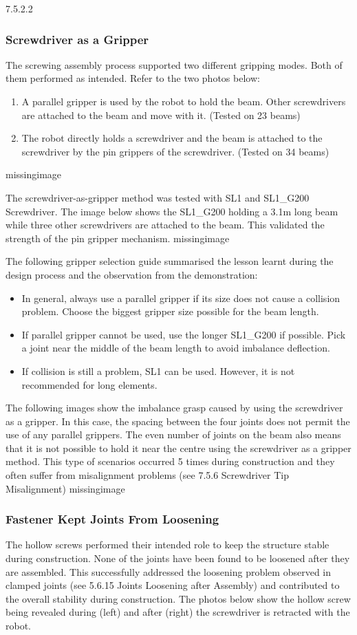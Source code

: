 7.5.2.2 \subsubsection{Screwdriver as a Gripper}
The screwing assembly process supported two different gripping modes. Both of them performed as intended. Refer to the two photos below:
\begin{enumerate}
    \item A parallel gripper is used by the robot to hold the beam. Other screwdrivers are attached to the beam and move with it. (Tested on 23 beams)
    \item The robot directly holds a screwdriver and the beam is attached to the screwdriver by the pin grippers of the screwdriver.  (Tested on 34 beams)
\end{enumerate}
missingimage

The screwdriver-as-gripper method was tested with SL1 and SL1\_G200 Screwdriver. The image below shows the SL1\_G200 holding a 3.1m long beam while three other screwdrivers are attached to the beam. This validated the strength of the pin gripper mechanism.
missingimage

The following gripper selection guide summarised the lesson learnt during the design process and the observation from the demonstration:
\begin{itemize}
    \item In general, always use a parallel gripper if its size does not cause a collision problem. Choose the biggest gripper size possible for the beam length.
    \item If parallel gripper cannot be used, use the longer SL1\_G200 if possible. Pick a joint near the middle of the beam length to avoid imbalance deflection.
    \item If collision is still a problem, SL1 can be used. However, it is not recommended for long elements.
\end{itemize}
The following images show the imbalance grasp caused by using the screwdriver as a gripper. In this case, the spacing between the four joints does not permit the use of any parallel grippers. The even number of joints on the beam also means that it is not possible to hold it near the centre using the screwdriver as a gripper method. This type of scenarios occurred 5 times during construction and they often suffer from misalignment problems (see 7.5.6 Screwdriver Tip Misalignment)
missingimage

\subsubsection{Fastener Kept Joints From Loosening}
The hollow screws performed their intended role to keep the structure stable during construction. None of the joints have been found to be loosened after they are assembled. This successfully addressed the loosening problem observed in clamped joints (see 5.6.15 Joints Loosening after Assembly) and contributed to the overall stability during construction. The photos below show the hollow screw being revealed during (left) and after (right) the screwdriver is retracted with the robot.


